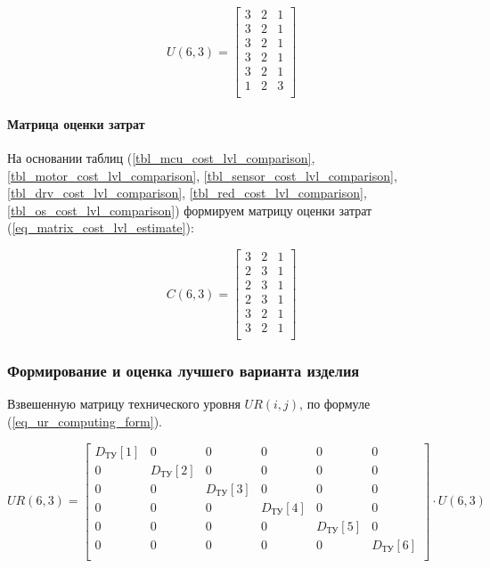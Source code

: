 \begin{equation}
    U(6,3) =
    \begin{bmatrix}
        3 & 2 & 1 \\
        3 & 2 & 1 \\
        3 & 2 & 1 \\
        3 & 2 & 1 \\
        3 & 2 & 1 \\
        1 & 2 & 3 \\
    \end{bmatrix}
    \label{eq_matrix_tech_lvl_estimate}
\end{equation}

\paragraph{Матрица оценки затрат}

На основании таблиц (\ref{tbl_mcu_cost_lvl_comparison},
\ref{tbl_motor_cost_lvl_comparison},
\ref{tbl_sensor_cost_lvl_comparison},
\ref{tbl_drv_cost_lvl_comparison},
\ref{tbl_red_cost_lvl_comparison},
\ref{tbl_os_cost_lvl_comparison})
формируем матрицу оценки затрат
(\ref{eq_matrix_cost_lvl_estimate}):

\begin{equation}
    C(6,3) =
    \begin{bmatrix}
        3 & 2 & 1 \\
        2 & 3 & 1 \\
        2 & 3 & 1 \\
        2 & 3 & 1 \\
        3 & 2 & 1 \\
        3 & 2 & 1 \\
    \end{bmatrix}
    \label{eq_matrix_cost_lvl_estimate}
\end{equation}

\subsubsection{Формирование и оценка лучшего варианта изделия}
Взвешенную матрицу технического уровня $UR(i, j)$, по формуле
(\ref{eq_ur_computing_form}).

\begin{equation}
    UR(6,3) =
        \begin{bmatrix}
            D_\text{ТУ}[1] & 0 & 0 & 0 & 0 & 0 \\
            0 & D_\text{ТУ}[2] & 0 & 0 & 0 & 0 \\
            0 & 0 & D_\text{ТУ}[3] & 0 & 0 & 0 \\
            0 & 0 & 0 & D_\text{ТУ}[4] & 0 & 0 \\
            0 & 0 & 0 & 0 & D_\text{ТУ}[5] & 0 \\
            0 & 0 & 0 & 0 & 0 & D_\text{ТУ}[6] \\
        \end{bmatrix}
        \cdot
        U(6,3)
    \label{eq_ur_computing_form}
\end{equation}

